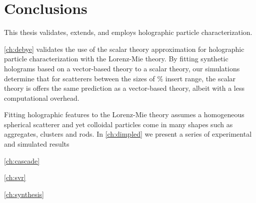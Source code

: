 \chapter{Conclusions}
\label{ch:conclusion}

This thesis validates, extends, and employs holographic
particle characterization. 

\autoref{ch:debye} validates the use of the scalar theory
approximation for holographic particle characterization
with the Lorenz-Mie theory. By fitting synthetic holograms
based on a vector-based theory to a scalar theory,
our simulations determine that for scatterers between the
sizes of \% insert range, the scalar theory is offers
the same prediction as a vector-based theory, albeit
with a less computational overhead. 

Fitting holographic features to the Lorenz-Mie theory
assumes a homogeneous spherical scatterer and yet colloidal particles
come in many shapes such as aggregates, clusters and rods. In \autoref{ch:dimpled}
we present a series of experimental and simulated results


\autoref{ch:cascade}

\autoref{ch:svr}

\autoref{ch:synthesis}
